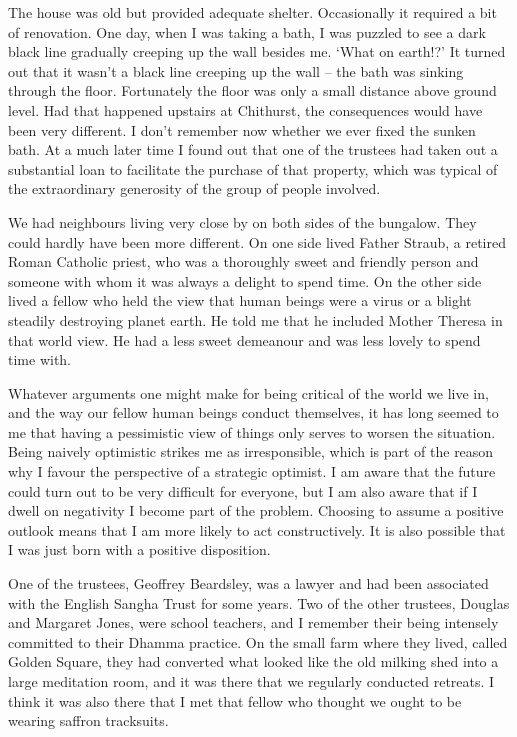 The house was old but provided adequate shelter. Occasionally it
required a bit of renovation. One day, when I was taking a bath, I was
puzzled to see a dark black line gradually creeping up the wall besides
me. `What on earth!?' It turned out that it wasn't a black line creeping
up the wall -- the bath was sinking through the floor. Fortunately the
floor was only a small distance above ground level. Had that happened
upstairs at Chithurst, the consequences would have been very different.
I don't remember now whether we ever fixed the sunken bath. At a much
later time I found out that one of the trustees had taken out a
substantial loan to facilitate the purchase of that property, which was
typical of the extraordinary generosity of the group of people involved.

We had neighbours living very close by on both sides of the bungalow.
They could hardly have been more different. On one side lived Father
Straub, a retired Roman Catholic priest, who was a thoroughly sweet and
friendly person and someone with whom it was always a delight to spend
time. On the other side lived a fellow who held the view that human
beings were a virus or a blight steadily destroying planet earth. He
told me that he included Mother Theresa in that world view. He had a
less sweet demeanour and was less lovely to spend time with.

Whatever arguments one might make for being critical of the world we
live in, and the way our fellow human beings conduct themselves, it has
long seemed to me that having a pessimistic view of things only serves
to worsen the situation. Being naively optimistic strikes me as
irresponsible, which is part of the reason why I favour the
perspective of a strategic optimist. I am aware that the future could
turn out to be very difficult for everyone, but I am also aware that if
I dwell on negativity I become part of the problem. Choosing to assume a
positive outlook means that I am more likely to act constructively. It
is also possible that I was just born with a positive disposition.

One of the trustees, Geoffrey Beardsley, was a lawyer and had been
associated with the English Sangha Trust for some years. Two of the
other trustees, Douglas and Margaret Jones, were school teachers, and I
remember their being intensely committed to their Dhamma practice. On
the small farm where they lived, called Golden Square, they had
converted what looked like the old milking shed into a large meditation
room, and it was there that we regularly conducted retreats. I think it
was also there that I met that fellow who thought we ought to be wearing
saffron tracksuits.


